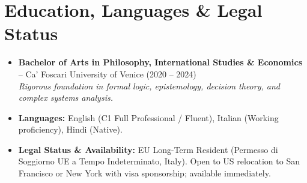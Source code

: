 \documentclass[a4paper,10pt]{article}
\begin{document}
\section{Education, Languages \& Legal Status}
\begin{itemize}
  \item \textbf{Bachelor of Arts in Philosophy, International Studies \& Economics} -- Ca' Foscari University of Venice (2020 -- 2024) \\
  \textit{Rigorous foundation in formal logic, epistemology, decision theory, and complex systems analysis.}
  \item \textbf{Languages:} English (C1 Full Professional / Fluent), Italian (Working proficiency), Hindi (Native).
  \item \textbf{Legal Status \& Availability:} EU Long-Term Resident (Permesso di Soggiorno UE a Tempo Indeterminato, Italy). Open to US relocation to San Francisco or New York with visa sponsorship; available immediately.
\end{itemize}
\end{document}
